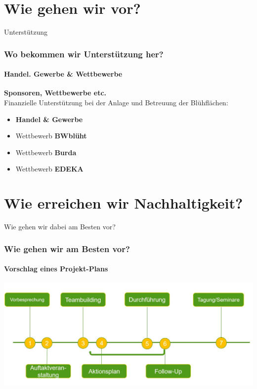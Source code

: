 \documentclass[aspectratio=43]{beamer}
\begin{document}
\section[Jahr]{Wie gehen wir vor?}

\begin{frame}{Unterstützung}
\frametitle{Wo bekommen wir Unterstützung her?} 
\framesubtitle{Handel. Gewerbe \& Wettbewerbe}

\textbf{Sponsoren, Wettbewerbe etc.}\\
Finanzielle Unterstützung bei der Anlage und Betreuung der Blühflächen:

\begin{itemize}
	\item 
	\textbf{Handel \& Gewerbe} \pause 
	\item
	Wettbewerb \textbf{BWblüht} \pause
	\item 
	Wettbewerb \textbf{Burda} \pause
	\item 
	Wettbewerb \textbf{EDEKA}%

\end{itemize}
\end{frame}




\section{Wie erreichen wir Nachhaltigkeit?}

\begin{frame}{Wie gehen wir dabei am Besten vor?}
\frametitle{Wie gehen wir am Besten vor?} 
\framesubtitle{Vorschlag eines Projekt-Plans}

\begin{center}
	
	\includegraphics[width=1.0\textwidth]{figures/Ablaufschema.JPG}
	
\end{center}

\end{frame}
\end{document}
